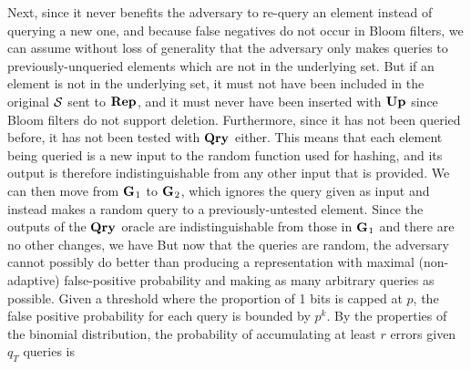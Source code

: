 Next, since it never benefits the
adversary to re-query an element instead of querying a new one, and because
false negatives do not occur in Bloom filters, we can assume without loss of
generality that the adversary only makes queries to previously-unqueried
elements which are not in the underlying set. But if an element is not in the
underlying set, it must not have been included in the original $\mathcal{S}$ sent to
$\textup{\textbf{Rep}}\hspace{0.5pt}$, and it must never have been inserted with $\textup{\textbf{Up}}\hspace{0.5pt}$ since Bloom filters do
not support deletion. Furthermore, since it has not been queried before, it has
not been tested with $\textup{\textbf{Qry}}\hspace{0.5pt}$ either. This means that each element being queried
is a new input to the random function used for hashing, and its output is
therefore indistinguishable from any other input that is provided. We can then
move from $\textup{\textbf{G}}\hspace{0.5pt}_1$ to $\textup{\textbf{G}}\hspace{0.5pt}_2$, which ignores the query given as input and
instead makes a random query to a previously-untested element. Since the outputs
of the $\textup{\textbf{Qry}}\hspace{0.5pt}$ oracle are indistinguishable from those in $\textup{\textbf{G}}\hspace{0.5pt}_1$ and there
are no other changes, we have
%
%
But now
that the queries are random, the adversary cannot possibly do better than
producing a representation with maximal (non-adaptive) false-positive
probability and making as many arbitrary queries as possible. Given a threshold
where the proportion of 1 bits is capped at $p$,  the false positive probability for each query is bounded by $p^k$.
%
%
By the properties of the binomial distribution, the probability of accumulating
at
least $r$ errors given $q_T$ queries is
